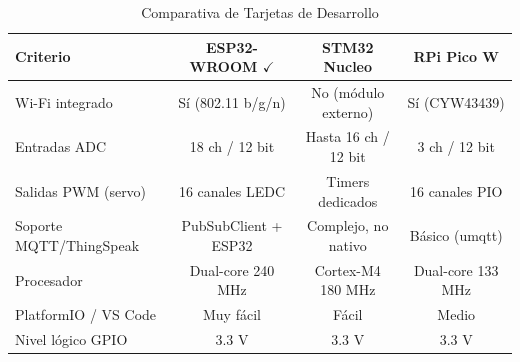 \begin{table}[tp]
\centering
\renewcommand{\arraystretch}{1.3}
\caption{Comparativa de Tarjetas de Desarrollo}
\label{tab:comparativa_tarjetas}
\begin{tabularx}{\textwidth}{|X|c|c|c|}
\hline
\textbf{Criterio} & \textbf{ESP32-WROOM} $\checkmark$ & \textbf{STM32 Nucleo} & \textbf{RPi Pico W} \\
\hline
Wi-Fi integrado & Sí (802.11 b/g/n) & No (módulo externo) & Sí (CYW43439) \\
\hline
Entradas ADC & 18 ch / 12 bit & Hasta 16 ch / 12 bit & 3 ch / 12 bit \\
\hline
Salidas PWM (servo) & 16 canales LEDC & Timers dedicados & 16 canales PIO \\
\hline
Soporte MQTT/ThingSpeak & PubSubClient + ESP32 & Complejo, no nativo & Básico (umqtt) \\
\hline
Procesador & Dual-core 240 MHz & Cortex-M4 180 MHz & Dual-core 133 MHz \\
\hline
PlatformIO / VS Code & Muy fácil & Fácil & Medio \\
\hline
Nivel lógico GPIO & 3.3 V & 3.3 V & 3.3 V \\
\hline
\end{tabularx}
\end{table}